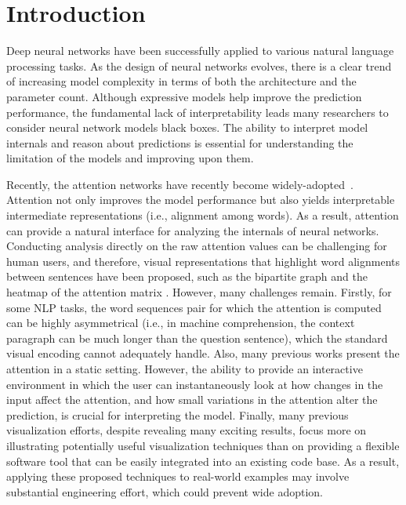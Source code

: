 \section{Introduction}

Deep neural networks have been successfully applied to various natural language processing tasks.
As the design of neural networks evolves, there is a clear trend of increasing model complexity in terms of both the architecture and the parameter count. 
%
Although expressive models help improve the prediction performance, the fundamental lack of interpretability leads many researchers to consider neural network models black boxes. 
%
The ability to interpret model internals and reason about predictions is essential for understanding the limitation of the models and improving upon them.

Recently, the attention networks have recently become  widely-adopted~\cite{bahdanau2014neural,seo2016bidirectional,Parikh2016, VaswaniShazeerParmar2017}. Attention not only improves the model performance but also yields interpretable intermediate representations (i.e., alignment among words). As a result, attention can provide a natural interface for analyzing the internals of neural networks. Conducting analysis directly on the raw attention values can be challenging for human users, and therefore, visual representations that highlight word alignments between sentences have been proposed, such as the bipartite graph and the heatmap of the attention matrix \cite{LiChenHovy2015, li2016understanding, lee2017interactive}.  However, many challenges remain. Firstly, for some NLP tasks, the word sequences pair for which the attention is computed can be highly asymmetrical (i.e., in machine comprehension, the context paragraph can be much longer than the question sentence), which the standard visual encoding cannot adequately handle.  Also, many previous works present the attention in a static setting. However, the ability to provide an interactive environment in which the user can instantaneously look at how changes in the input affect the attention, and how small variations in the attention alter the prediction, is crucial for interpreting the model. Finally, many previous visualization efforts, despite revealing many exciting results, focus more on illustrating potentially useful visualization techniques than on providing a flexible software tool that can be easily integrated into an existing code base. As a result, applying these proposed techniques to real-world examples may involve substantial engineering effort, which could prevent wide adoption.


